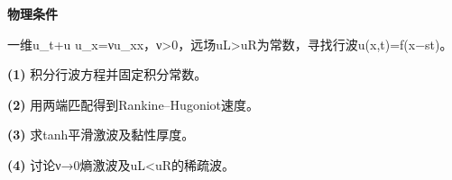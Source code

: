 \textbf{物理条件}\par 一维u\_t+u u\_x=νu\_xx，ν>0，远场uL>uR为常数，寻找行波u(x,t)=f(x−st)。
\par\noindent\textbf{(1)} 积分行波方程并固定积分常数。
\par\noindent\textbf{(2)} 用两端匹配得到Rankine–Hugoniot速度。
\par\noindent\textbf{(3)} 求tanh平滑激波及黏性厚度。
\par\noindent\textbf{(4)} 讨论ν→0熵激波及uL<uR的稀疏波。
